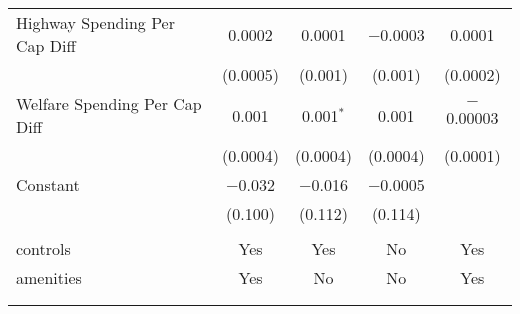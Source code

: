 \begin{table}[!htbp]
\begin{tabular}{@{\extracolsep{5pt}}lcccc}
  Highway Spending Per Cap Diff & 0.0002 & 0.0001 & $-$0.0003 & 0.0001 \\ 
  & (0.0005) & (0.001) & (0.001) & (0.0002) \\ 
  Welfare Spending Per Cap Diff & 0.001 & 0.001$^{*}$ & 0.001 & $-$0.00003 \\ 
  & (0.0004) & (0.0004) & (0.0004) & (0.0001) \\ 
  Constant & $-$0.032 & $-$0.016 & $-$0.0005 &  \\ 
  & (0.100) & (0.112) & (0.114) &  \\ 
 \hline \\[-1.8ex] 
controls & Yes & Yes & No & Yes \\ 
amenities & Yes & No & No & Yes \\ 
\hline \\[-1.8ex] 
\hline 
\hline \\[-1.8ex] 
\end{tabular} 
\end{table} 
